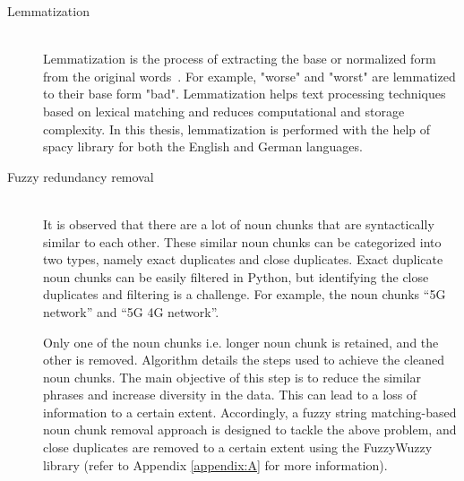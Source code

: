 \begin{description}
 	
 	\item[Lemmatization] \hfill \\  Lemmatization is the process of extracting the base or normalized form from the original words~\cite{plisson2004rule}. For example, "worse" and "worst" are lemmatized to their base form "bad". Lemmatization helps text processing techniques based on lexical matching and reduces computational and storage complexity. In this thesis, lemmatization is performed with the help of spacy library for both the English and German languages.
 	
 	
 	\item[Fuzzy redundancy removal] \hfill \\  It is observed that there are a lot of noun chunks that are syntactically similar to each other. These similar noun chunks can be categorized into two types, namely exact duplicates and close duplicates. Exact duplicate noun chunks can be easily filtered in Python, but identifying the close duplicates and filtering is a challenge. For example, the noun chunks ``5G network'' and ``5G 4G network''. 
 	
 	Only one of the noun chunks i.e. longer noun chunk is retained, and the other is removed. Algorithm  details the steps used to achieve the cleaned noun chunks. The main objective of this step is to reduce the similar phrases and increase diversity in the data. This can lead to a loss of information to a certain extent. Accordingly, a fuzzy string matching-based noun chunk removal approach is designed to tackle the above problem, and close duplicates are removed to a certain extent using the FuzzyWuzzy library (refer to Appendix \ref{appendix:A} for more information).
 	
 	
 \end{description}

